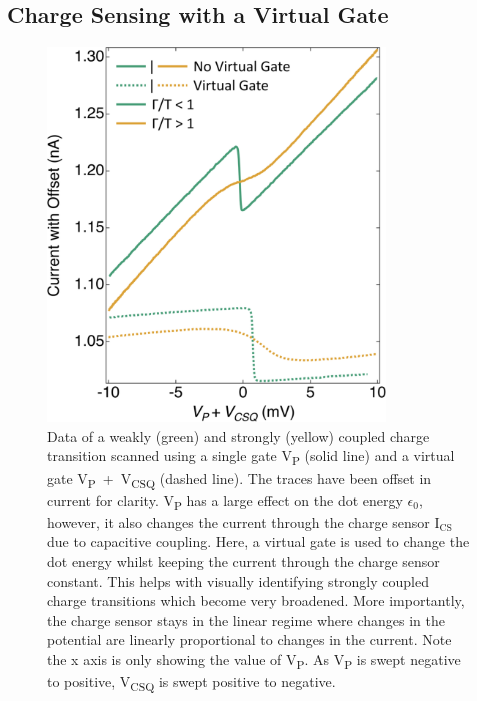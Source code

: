 \subsection{Charge Sensing with a Virtual Gate}

\begin{figure}[!htb]
 \begin{center}
  \includegraphics[width=0.8\textwidth]{figures/ch1/crop_FiguresMaster.012.png}
  \caption[Measuring charge transitions with and without a virtual gate]{\label{fig:ch1/virtual_gate_example} 
  Data of a weakly (green) and strongly (yellow) coupled charge transition scanned using a single gate V\textsubscript{P} (solid line) and a virtual gate V\textsubscript{P}~+~V\textsubscript{CSQ} (dashed line). The traces have been offset in current for clarity. V\textsubscript{P} has a large effect on the dot energy $\epsilon_0$, however, it also changes the current through the charge sensor $\mathrm{I_{CS}}$ due to capacitive coupling. Here, a virtual gate is used to change the dot energy whilst keeping the current through the charge sensor constant. This helps with visually identifying strongly coupled charge transitions which become very broadened. More importantly, the charge sensor stays in the linear regime where changes in the potential are linearly proportional to changes in the current. Note the x axis is only showing the value of V\textsubscript{P}. As V\textsubscript{P} is swept negative to positive, V\textsubscript{CSQ} is swept positive to negative.}
 \end{center}
\end{figure}



